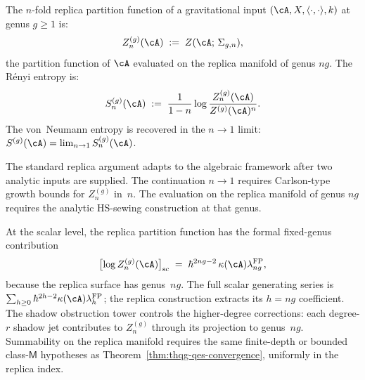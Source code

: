 \begin{conjecture}
\label{conj:thqg-replica}
The $n$-fold replica partition function of a gravitational input
$(\cA, X, \langle \cdot, \cdot \rangle, k)$ at genus $g \ge 1$
is:
\begin{equation}\label{eq:thqg-replica-pf}
Z_n^{(g)}(\cA)
\;:=\;
Z(\cA;\, \Sigma_{g,n}),
\end{equation}
the partition function of $\cA$ evaluated on the replica manifold
of genus $ng$. The R\'enyi entropy is:
\begin{equation}\label{eq:thqg-renyi}
S_n^{(g)}(\cA)
\;:=\;
\frac{1}{1-n}
\log\frac{Z_n^{(g)}(\cA)}{Z^{(g)}(\cA)^n}.
\end{equation}
The von~Neumann entropy is recovered in the $n \to 1$ limit:
$S^{(g)}(\cA) = \lim_{n \to 1} S_n^{(g)}(\cA)$.
\end{conjecture}

\begin{remark}
The standard replica argument
\cite{Calabrese-Cardy04,Lewkowycz-Maldacena13} adapts to the
algebraic framework after two analytic inputs are supplied.  The
continuation $n\to1$ requires Carlson-type growth bounds for
$Z_n^{(g)}$ in~$n$.  The evaluation on the replica manifold of genus
$ng$ requires the analytic HS-sewing construction at that genus.
\end{remark}

\begin{remark}
\label{rem:thqg-shadow-on-replica}
At the scalar level, the replica partition function has the formal
fixed-genus contribution
\[
\bigl[\log Z_n^{(g)}(\cA)\bigr]_{\mathrm{sc}}
\;=\;
\hbar^{2ng-2}\,\kappa(\cA)\lambda_{ng}^{\mathrm{FP}},
\]
because the replica surface has genus~$ng$.  The full scalar
generating series is
$\sum_{h\ge0}\hbar^{2h-2}\kappa(\cA)\lambda_h^{\mathrm{FP}}$; the
replica construction extracts its $h=ng$ coefficient.
The shadow obstruction tower controls the higher-degree corrections:
each degree-$r$ shadow jet contributes to $Z_n^{(g)}$
through its projection to genus~$ng$.  Summability on the replica
manifold requires the same finite-depth or bounded class-$\mathsf M$
hypotheses as Theorem~\ref{thm:thqg-qes-convergence}, uniformly in the
replica index.
\end{remark}

%
%

